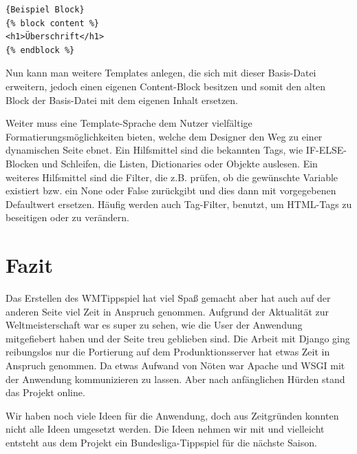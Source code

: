 \documentclass[titlepage, 12pt,a4paper]{scrartcl}
\begin{document}
\begin{lstlisting}[caption=Beispiel]{Beispiel Block}
{% block content %}
<h1>Überschrift</h1>
{% endblock %}
\end{lstlisting}
 
Nun kann man weitere Templates anlegen, die sich mit dieser Basis-Datei 
erweitern, jedoch einen eigenen Content-Block besitzen und somit den alten
Block  der Basis-Datei mit dem eigenen Inhalt ersetzen.

Weiter muss eine Template-Sprache dem Nutzer vielfältige 
Formatierungsmöglichkeiten bieten, welche dem Designer den Weg zu einer 
dynamischen Seite ebnet. Ein Hilfsmittel sind die bekannten Tags, wie 
IF-ELSE-Blocken und Schleifen, die Listen, Dictionaries oder Objekte auslesen. 
Ein weiteres Hilfsmittel sind die Filter, die z.B. prüfen, ob die gewünschte 
Variable existiert bzw. ein None oder False zurückgibt und dies dann mit 
vorgegebenen Defaultwert ersetzen. Häufig werden auch Tag-Filter, benutzt, um 
HTML-Tags zu beseitigen oder zu verändern.

\section{Fazit}
Das Erstellen des WMTippspiel hat viel Spaß gemacht aber hat auch auf der
anderen Seite viel Zeit in Anspruch genommen. Aufgrund der Aktualität zur
Weltmeisterschaft war es super zu sehen, wie die User der Anwendung
mitgefiebert haben und der Seite treu geblieben sind. Die Arbeit mit Django ging
reibungslos nur die Portierung auf dem Produnktionsserver hat etwas Zeit in 
Anspruch genommen. Da etwas Aufwand von Nöten war Apache und WSGI mit der 
Anwendung kommunizieren zu lassen. Aber nach anfänglichen Hürden stand das 
Projekt online.

Wir haben noch viele Ideen für die Anwendung, doch aus Zeitgründen konnten
nicht alle Ideen umgesetzt werden. Die Ideen nehmen wir mit und vielleicht
entsteht aus dem Projekt ein Bundesliga-Tippspiel für die nächste Saison. 
\end{document}
